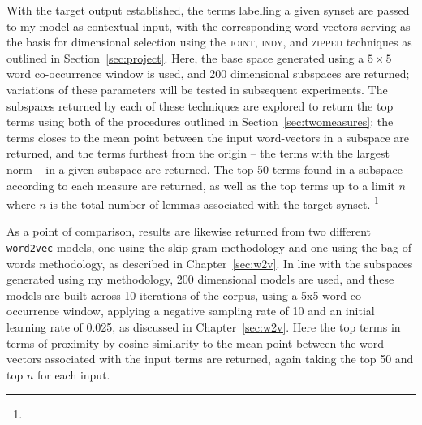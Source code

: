 With the target output established, the terms labelling a given synset are passed to my model as contextual input, with the corresponding word-vectors serving as the basis for dimensional selection using the \textsc{joint}, \textsc{indy}, and \textsc{zipped} techniques as outlined in Section~\ref{sec:project}.  Here, the base space generated using a $5 \times 5$ word co-occurrence window is used, and 200 dimensional subspaces are returned; variations of these parameters will be tested in subsequent experiments.  The subspaces returned by each of these techniques are explored to return the top terms using both of the procedures outlined in Section~\ref{sec:twomeasures}: the terms closes to the mean point between the input word-vectors in a subspace are returned, and the terms furthest from the origin -- the terms with the largest norm -- in a given subspace are returned.  The top 50 terms found in a subspace according to each measure are returned, as well as the top terms up to a limit $n$ where $n$ is the total number of lemmas associated with the target synset.   \footnote{}

As a point of comparison, results are likewise returned from two different \texttt{word2vec} models, one using the skip-gram methodology and one using the bag-of-words methodology, as described in Chapter~\ref{sec:w2v}.  In line with the subspaces generated using my methodology, 200 dimensional models are used, and these models are built across 10 iterations of the corpus, using a 5x5 word co-occurrence window, applying a negative sampling rate of 10 and an initial learning rate of 0.025, as discussed in Chapter~\ref{sec:w2v}.  Here the top terms in terms of proximity by cosine similarity to the mean point between the word-vectors associated with the input terms are returned, again taking the top 50 and top $n$ for each input.

